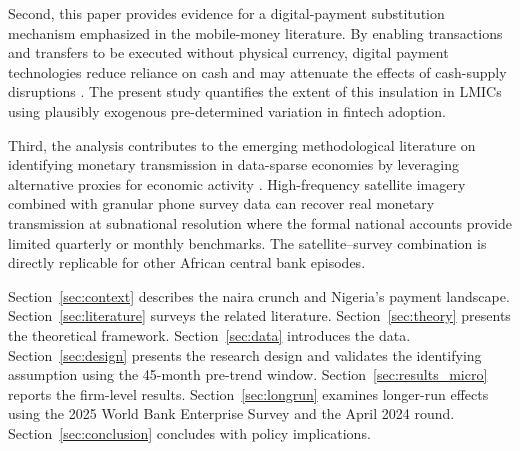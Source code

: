 Second, this paper provides evidence for a digital-payment substitution mechanism 
emphasized in the mobile-money literature. By enabling transactions and transfers to be 
executed without physical currency, digital payment technologies reduce reliance on 
cash and may attenuate the effects of cash-supply disruptions \citep{jack2014risk}. 
The present study quantifies the extent of this insulation 
in LMICs using plausibly exogenous pre-determined variation in fintech adoption. 


Third, the analysis contributes to the emerging methodological literature on
identifying monetary transmission in data-sparse economies by leveraging alternative proxies 
for economic activity 
\citep[see][]{henderson2012measuring,donaldson2016view}. High-frequency satellite
imagery combined with granular phone survey data can recover real monetary
transmission at subnational resolution where the formal national accounts
provide limited quarterly or monthly benchmarks. The satellite--survey combination
is directly replicable for other African central bank episodes.

Section~\ref{sec:context} describes the naira crunch and Nigeria's payment
landscape. Section~\ref{sec:literature} surveys the related literature.
Section~\ref{sec:theory} presents the theoretical framework.
Section~\ref{sec:data} introduces the data. Section~\ref{sec:design}
presents the research design and validates the identifying assumption using
the 45-month \NTL{} pre-trend window. Section~\ref{sec:results_micro} reports
the firm-level results. Section~\ref{sec:longrun} examines longer-run effects
using the 2025 World Bank Enterprise Survey and the April 2024 \NLPS{} round.
Section~\ref{sec:conclusion} concludes with policy implications.
